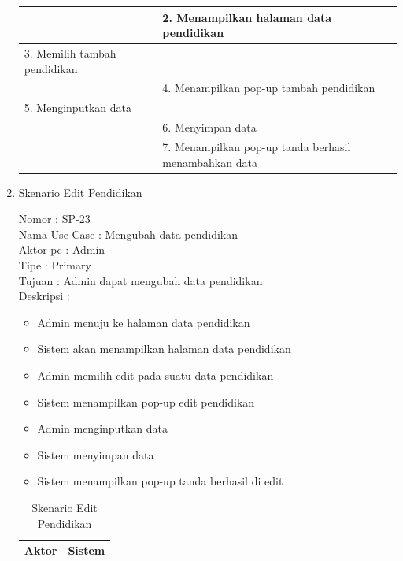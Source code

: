 \begin{enumerate}
\begin{table}
\begin{tabular}{ | l | p{65mm} |}
		\hline
		
		&  2.	Menampilkan halaman data pendidikan \\
		
		\hline
		
		3. Memilih tambah pendidikan & \\
		
		\hline
		
		& 4.	Menampilkan pop-up tambah pendidikan \\
		
		\hline
		
		5.	Menginputkan data  & \\
		\hline
		
		& 6.	Menyimpan data \\
		\hline
		
		& 7.	Menampilkan pop-up tanda berhasil menambahkan data \\
		\hline
		
	\end{tabular}
\end{table}

\item Skenario Edit Pendidikan

Nomor \kern 3.6pc : SP-23 \\
Nama Use Case : Mengubah data pendidikan \\
Aktor  pc : Admin \\
Tipe \kern 4.6pc : Primary \\
Tujuan \kern 3.6pc : Admin dapat mengubah data pendidikan \\
Deskripsi \kern 2.5pc : 

\begin{itemize}
	\item Admin menuju ke halaman data pendidikan
	\item Sistem akan menampilkan halaman data pendidikan
	\item Admin memilih edit pada suatu data pendidikan
	\item Sistem menampilkan pop-up edit pendidikan
	\item Admin menginputkan data
	\item Sistem menyimpan data
	\item Sistem menampilkan pop-up tanda berhasil di edit
	
\end{itemize}

\begin{table}
	\caption{Skenario Edit Pendidikan}
	\centering
	\begin{tabular}{ | p{55mm} | p{70mm} |}
		\hline 
		\textbf{Aktor} & \textbf{Sistem} \\
		\hline
		

\end{tabular}
\end{table}
\end{enumerate}
